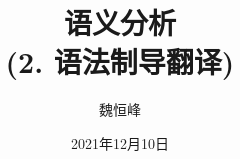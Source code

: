 \documentclass[]{beamer}
\title[语义分析]{语义分析 \\ (2. 语法制导翻译)}
\author[魏恒峰]{\large 魏恒峰}
\institute{hfwei@nju.edu.cn}
\date{2021年12月10日}
\begin{document}
\maketitle




\thankyou{}

\end{document}
